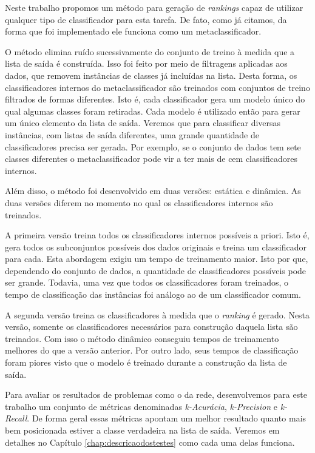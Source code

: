 Neste trabalho propomos um método para geração de \textit{rankings} capaz de utilizar qualquer tipo de classificador para esta tarefa.
De fato, como já citamos, da forma que foi implementado ele funciona como um metaclassificador.

O método elimina ruído sucessivamente do conjunto de treino à medida que a lista de saída é construída.
Isso foi feito por meio de filtragens aplicadas aos dados, que removem instâncias de classes já incluídas na lista.
Desta forma, os classificadores internos do metaclassificador são treinados com conjuntos de treino filtrados de formas diferentes.
Isto é, cada classificador gera um modelo único do qual algumas classes foram retiradas.
Cada modelo é utilizado então para gerar um único elemento da lista de saída.
Veremos que para classificar diversas instâncias, com listas de saída diferentes, uma grande quantidade de classificadores precisa ser gerada.
Por exemplo, se o conjunto de dados tem sete classes diferentes o metaclassificador pode vir a ter mais de cem classificadores internos.

Além disso, o método foi desenvolvido em duas versões: estática e dinâmica.
As duas versões diferem no momento no qual os classificadores internos são treinados.

A primeira versão treina todos os classificadores internos possíveis a priori.
Isto é, gera todos os subconjuntos possíveis dos dados originais e treina um classificador para cada.
Esta abordagem exigiu um tempo de treinamento maior.
Isto por que, dependendo do conjunto de dados, a quantidade de classificadores possíveis pode ser grande.
Todavia, uma vez que todos os classificadores foram treinados, o tempo de classificação das instâncias foi análogo ao de um classificador comum.

A segunda versão treina os classificadores à medida que o \textit{ranking} é gerado.
Nesta versão, somente os classificadores necessários para construção daquela lista são treinados.
Com isso o método dinâmico conseguiu tempos de treinamento melhores do que a versão anterior.
Por outro lado, seus tempos de classificação foram piores visto que o modelo é treinado durante a construção da lista de saída.

Para avaliar os resultados de problemas como o da rede, desenvolvemos para este trabalho um conjunto de métricas denominadas \textit{k-Acurácia}, \textit{k-Precision} e \textit{k-Recall}.
De forma geral essas métricas apontam um melhor resultado quanto mais bem posicionada estiver a classe verdadeira na lista de saída.
Veremos em detalhes no Capítulo \ref{chap:descricaodostestes} como cada uma delas funciona.

